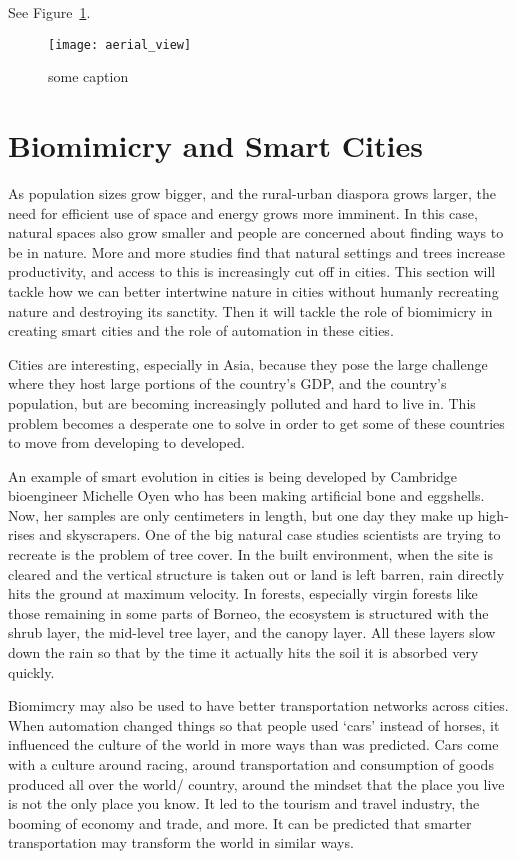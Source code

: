 See Figure~\ref{fig:aerial_view}.

\begin{figure}[h]
\texttt{[image: aerial\_view]}
\caption{some caption}
\label{fig:aerial_view}
\end{figure}

\section{Biomimicry and Smart Cities}

As population sizes grow bigger, and the rural-urban diaspora grows larger, the need for efficient use of space and energy grows more imminent. In this case, natural spaces also grow smaller and people are concerned about finding ways to be in nature. More and more studies find that natural settings and trees increase productivity, and access to this is increasingly cut off in cities. This section will tackle how we can better intertwine nature in cities without humanly recreating nature and destroying its sanctity. Then it will tackle the role of biomimicry in creating smart cities and the role of automation in these cities. 

Cities are interesting, especially in Asia, because they pose the large challenge where they host large portions of the country's GDP, and the country's population, but are becoming increasingly polluted and hard to live in. This problem becomes a desperate one to solve in order to get some of these countries to move from developing to developed.

An example of smart evolution in cities is being developed by Cambridge bioengineer Michelle Oyen who has been making artificial bone and eggshells. Now, her samples are only centimeters in length, but one day they make up high-rises and skyscrapers. One of the big natural case studies scientists are trying to recreate is the problem of tree cover. In the built environment, when the site is cleared and the vertical structure is taken out or land is left barren, rain directly hits the ground at maximum velocity. In forests, especially virgin forests like those remaining in some parts of Borneo, the ecosystem is structured with the shrub layer, the mid-level tree layer, and the canopy layer. All these layers slow down the rain so that by the time it actually hits the soil it is absorbed very quickly.

Biomimcry may also be used to have better transportation networks across cities. When automation changed things so that people used `cars' instead of horses, it influenced the culture of the world in more ways than was predicted. Cars come with a culture around racing, around transportation and consumption of goods produced all over the world/ country, around the mindset that the place you live is not the only place you know. It led to the tourism and travel industry, the booming of economy and trade, and more. It can be predicted that smarter transportation may transform the world in similar ways. 

